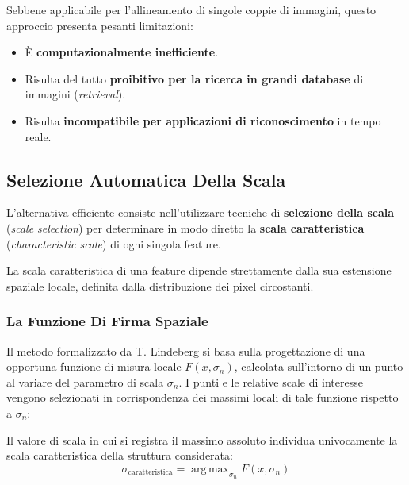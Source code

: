 ﻿\documentclass[11pt, a4paper]{article}
\DeclareMathOperator*{\argmax}{arg\,max}
\begin{document}
Sebbene applicabile per l'allineamento di singole coppie di immagini, questo approccio presenta pesanti limitazioni:
\begin{itemize}
    \item È \textbf{computazionalmente inefficiente}.
    \item Risulta del tutto \textbf{proibitivo per la ricerca in grandi database} di immagini (\emph{retrieval}).
    \item Risulta \textbf{incompatibile per applicazioni di riconoscimento} in tempo reale.
\end{itemize}

\subsection{Selezione Automatica Della Scala}

L'alternativa efficiente consiste nell'utilizzare tecniche di \textbf{selezione della scala} (\emph{scale selection}) per determinare in modo diretto la \textbf{scala caratteristica} (\emph{characteristic scale}) di ogni singola feature.


La scala caratteristica di una feature dipende strettamente dalla sua estensione spaziale locale, definita dalla distribuzione dei pixel circostanti.

\subsubsection{La Funzione Di Firma Spaziale}
Il metodo formalizzato da T. Lindeberg \cite{Lindeberg98} si basa sulla progettazione di una opportuna funzione di misura locale $F(x, \sigma_n)$, calcolata sull'intorno di un punto al variare del parametro di scala $\sigma_n$. I punti e le relative scale di interesse vengono selezionati in corrispondenza dei massimi locali di tale funzione rispetto a $\sigma_n$:


Il valore di scala in cui si registra il massimo assoluto individua univocamente la scala caratteristica della struttura considerata:
\[ \boxed{
    \sigma_{\text{caratteristica}} = \argmax_{\sigma_n} F(x, \sigma_n)
    }
\]
\end{document}
